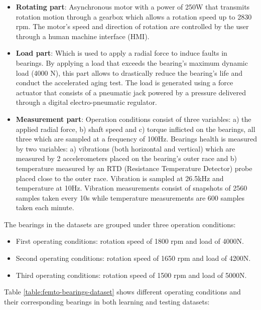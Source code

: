 \begin{itemize}
	\item \textbf{Rotating part}: Asynchronous motor with a power of 250W that transmits rotation motion through a gearbox which allows a rotation speed up to 2830 rpm. The motor's speed and direction of rotation are controlled by the user through a human machine interface (HMI).
	\item \textbf{Load part}: Which is used to apply a radial force to induce faults in bearings. By applying a load that exceeds the bearing's maximum dynamic load (4000 N), this part allows to drastically reduce the bearing's life and conduct the accelerated aging test. The load is generated using a force actuator that consists of a pneumatic jack powered by a pressure delivered through a digital electro-pneumatic regulator.
	\item \textbf{Measurement part}: Operation conditions consist of three variables: a) the applied radial force, b) shaft speed and c) torque inflicted on the bearings, all three which are sampled at a frequency of 100Hz. Bearings health is measured by two variables: a) vibrations (both horizontal and vertical) which are measured by 2 accelerometers placed on the bearing's outer race and b) temperature measured by an RTD (Resistance Temperature Detector) probe placed close to the outer race. Vibration is sampled at 26.5kHz and temperature at 10Hz. Vibration measurements consist of snapshots of 2560 samples taken every 10s while temperature measurements are 600 samples taken each minute.
\end{itemize}

The bearings in the datasets are grouped under three operation conditions:
\begin{itemize}
	\item First operating conditions: rotation speed of 1800 rpm and load of 4000N.
	\item Second operating conditions: rotation speed of 1650 rpm and load of 4200N.
	\item Third operating conditions: rotation speed of 1500 rpm and load of 5000N.
\end{itemize}

Table \ref{table:femto-bearings-dataset} shows different operating conditions and their corresponding bearings in both learning and testing datasets:

